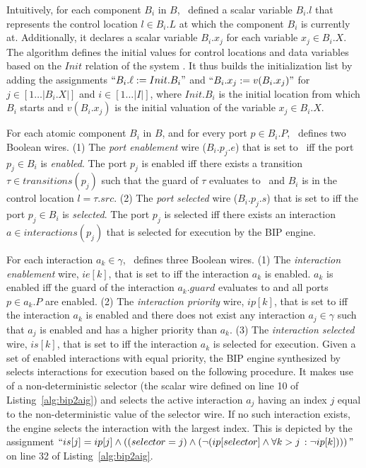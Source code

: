 Intuitively, for each component $B_i$ in $B$, \biptool~defined a scalar variable 
$B_i.l$ that represents the control location $l \in B_i.L$ at which the 
component $B_i$ is currently at. Additionally, it declares a scalar variable
$B_i.x_j$ for each variable $x_j \in B_i.X$. 
The algorithm defines the initial values for control locations and data variables 
based on the $Init$ relation of the system \Pm. It thus builds the initialization 
list by adding the assignments $``B_i.\ell := Init.B_i"$ and $``B_i.x_j := v(B_i.x_j)"$
for $j \in [1\ldots|B_i.X|]$ and $i \in [1\ldots|I|]$, where $Init.B_i$ is 
the initial location from which $B_i$ starts and $v(B_i.x_j)$ is the initial valuation of the
variable $x_j \in B_i.X$.


For each atomic component $B_i$ in $B$, and for every port $p \in B_i.P$, 
\biptool~defines two Boolean wires. 
(1) The {\em port enablement} wire ($B_i.p_j.e$) that is set to \true~iff the port $p_j \in B_i$ is 
{\em enabled}. The port $p_j$ is enabled iff there exists a transition $\tau \in transitions(p_j)$
such that the guard of $\tau$ evaluates to \true~and $B_i$ is in the control location $l = \tau.src$.
(2) The {\em port selected} wire ($B_i.p_j.s$) that is set to \true{} iff the port $p_j \in B_i$ is
{\em selected}. The port $p_j$ is selected iff there exists an interaction $a \in interactions(p_j)$
that is selected for execution by the BIP engine.

For each interaction $a_k \in \gamma$, \biptool~defines three Boolean wires. 
(1) The {\em interaction enablement} wire, $ie[k]$, that is set to \true{} iff the interaction
$a_k$ is enabled. $a_k$ is enabled iff the guard of the interaction $a_k.guard$ evaluates
to \true{} and all ports $p \in a_k.P$ are enabled. 
(2) The {\em interaction priority} wire, $ip[k]$, that is set to \true{} iff the interaction 
$a_k$ is enabled and there does not exist any interaction $a_j \in \gamma$ such that 
$a_j$ is enabled and has a higher priority than $a_k$.
(3) The {\em interaction selected} wire, $is[k]$, that is set to \true{} iff the
interaction $a_k$ is selected for execution. Given a set of enabled interactions 
with equal priority, the BIP engine synthesized by \biptool{}
selects interactions for execution based on the following procedure. It makes use of a
non-deterministic selector (the  scalar wire defined on line 10 
of Listing~\ref{alg:bip2aig}) and selects the active interaction $a_j$ having 
an index $j$ equal to the non-deterministic value of the selector wire.
If no such interaction exists, the engine selects the interaction with the largest 
index. 
This is depicted by the assignment $``is[j] = ip[j] \land \left( (selector = j) 
\land (\lnot (ip[selector] \land \forall{k > j}\,:\lnot ip[k])) \right)"$ on line 32 of Listing~\ref{alg:bip2aig}.

